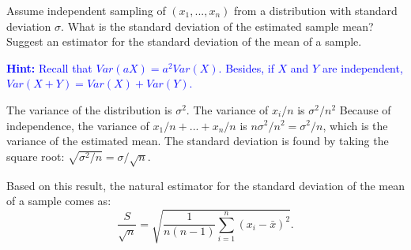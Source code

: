 \documentclass[a4paper]{article}
\theoremstyle{definition}
\begin{document}
\begin{Exercise}
\label{var}
Assume independent sampling of $(x_1, ..., x_n)$ from a distribution
with standard deviation $\sigma$. What is the standard deviation of the
estimated sample mean? Suggest an estimator for the standard deviation
of the mean of a sample.
\par\noindent\textcolor{Blue}{\textbf{Hint:} Recall that
$Var(aX) = a^2 Var(X)$. Besides, if $X$ and $Y$ are independent,
$Var(X+Y) = Var(X) + Var(Y)$.}
\end{Exercise}
\begin{Answer}
The variance of the distribution is $\sigma^2$. The variance of $x_i/n$
is $\sigma^2/n^2$ Because of independence, the variance of
$x_1/n + ...  + x_n/n$ is $n\sigma^2/n^2 = \sigma^2/n$, which is
the variance of the estimated mean. The standard deviation is found
by taking the square root: $\sqrt{\sigma^2/n} = \sigma/\sqrt{n}$.
\par
Based on this result, the natural estimator for the standard deviation
of the mean of a sample comes as:
\begin{equation}
  \frac{S}{\sqrt{n}} = \sqrt{\frac{1}{n(n-1)}\sum_{i=1}^n
    (x_i-\bar{x})^2}.
\end{equation}
\end{Answer}
\end{document}
